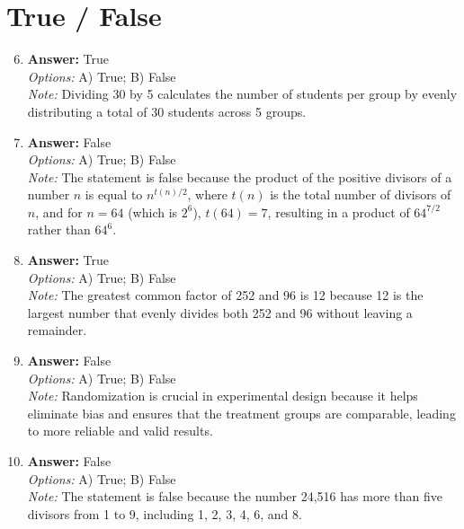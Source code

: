 \documentclass[12pt]{article}
\begin{document}
\section*{True / False}
\begin{enumerate}[label=\arabic*.]
\setcounter{enumi}{5}
\item \textbf{Answer:} True
\\ \textit{Options:} A) True; B) False
\\ \textit{Note:} Dividing 30 by 5 calculates the number of students per group by evenly distributing a total of 30 students across 5 groups.
\item \textbf{Answer:} False
\\ \textit{Options:} A) True; B) False
\\ \textit{Note:} The statement is false because the product of the positive divisors of a number \( n \) is equal to \( n^{t(n)/2} \), where \( t(n) \) is the total number of divisors of \( n \), and for \( n = 64 \) (which is \( 2^6 \)), \( t(64) = 7 \), resulting in a product of \( 64^{7/2} \) rather than \( 64^6 \).
\item \textbf{Answer:} True
\\ \textit{Options:} A) True; B) False
\\ \textit{Note:} The greatest common factor of 252 and 96 is 12 because 12 is the largest number that evenly divides both 252 and 96 without leaving a remainder.
\item \textbf{Answer:} False
\\ \textit{Options:} A) True; B) False
\\ \textit{Note:} Randomization is crucial in experimental design because it helps eliminate bias and ensures that the treatment groups are comparable, leading to more reliable and valid results.
\item \textbf{Answer:} False
\\ \textit{Options:} A) True; B) False
\\ \textit{Note:} The statement is false because the number 24,516 has more than five divisors from 1 to 9, including 1, 2, 3, 4, 6, and 8.
\end{enumerate}
\end{document}
